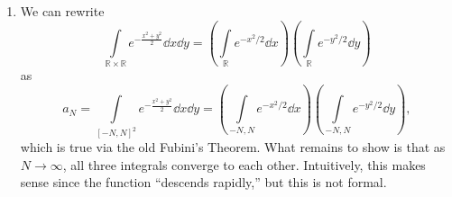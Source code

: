 \documentclass{article}
\numberwithin{equation}{section}
\begin{document}
\begin{enumerate}
    \item We can rewrite
    \begin{equation}
        \int\limits_{\mathbb{R} \times \mathbb{R}} e^{-\frac{x^2+y^2}{2}} \dd{x} \dd{y} = \left(\int\limits_{\mathbb{R}} e^{-x^2/2}\dd{x}\right) \left(\int\limits_{\mathbb{R}} e^{-y^2/2}\dd{y}\right)
    \end{equation}
    as
    \begin{equation}
        a_N = \int\limits_{[-N,N]^2} e^{-\frac{x^2+y^2}{2}} \dd{x} \dd{y} = \left(\int\limits_{-N,N} e^{-x^2/2} \dd{x}\right)\left(\int\limits_{-N,N}e^{-y^2/2}\dd{y}\right),
    \end{equation}
    which is true via the old Fubini's Theorem. What remains to show is that as $N\to\infty$, all three integrals converge to each other. Intuitively, this makes sense since the function ``descends rapidly,'' but this is not formal.
    

\end{enumerate}
\end{document}
